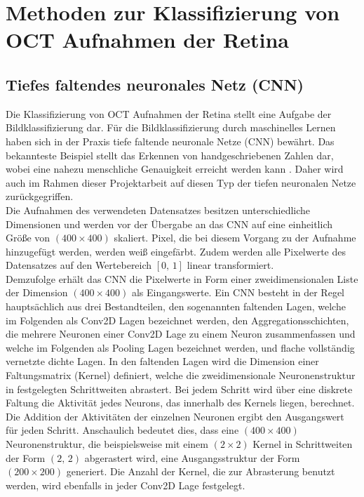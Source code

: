 \section{Methoden zur Klassifizierung von OCT Aufnahmen der Retina}
\subsection{Tiefes faltendes neuronales Netz (CNN)}
Die Klassifizierung von OCT Aufnahmen der Retina stellt eine Aufgabe der Bildklassifizierung dar. Für die Bildklassifizierung durch maschinelles Lernen haben sich in der Praxis tiefe faltende neuronale Netze (CNN) bewährt. Das bekannteste Beispiel stellt das Erkennen von handgeschriebenen Zahlen dar, wobei eine nahezu menschliche Genauigkeit erreicht werden kann \cite{MNIST}. Daher wird auch im Rahmen dieser Projektarbeit auf diesen Typ der tiefen neuronalen Netze zurückgegriffen. \\
Die Aufnahmen des verwendeten Datensatzes besitzen unterschiedliche Dimensionen und werden vor der Übergabe an das CNN auf eine einheitlich Grö{\ss}e von $(400\times 400)$ skaliert. Pixel, die bei diesem Vorgang zu der Aufnahme hinzugefügt werden, werden wei{\ss} eingefärbt. Zudem werden alle Pixelwerte des Datensatzes auf den Wertebereich $[0,\,1]$ linear transformiert. \\ 
Demzufolge erhält das CNN die Pixelwerte in Form einer zweidimensionalen Liste der Dimension $(400\times 400)$ als Eingangswerte. Ein CNN besteht in der Regel hauptsächlich aus drei Bestandteilen, den sogenannten faltenden Lagen, welche im Folgenden als Conv2D Lagen bezeichnet werden, den Aggregationsschichten, die mehrere Neuronen einer Conv2D Lage zu einem Neuron zusammenfassen und welche im Folgenden als Pooling Lagen bezeichnet werden, und flache vollständig vernetzte dichte Lagen. In den faltenden Lagen wird die Dimension einer Faltungsmatrix (Kernel) definiert, welche die zweidimensionale Neuronenstruktur in festgelegten Schrittweiten abrastert. Bei jedem Schritt wird über eine diskrete Faltung die Aktivität jedes Neurons, das innerhalb des Kernels liegen, berechnet. Die Addition der Aktivitäten der einzelnen Neuronen ergibt den Ausgangswert für jeden Schritt. Anschaulich bedeutet dies, dass eine $(400\times 400)$ Neuronenstruktur, die beispielsweise mit einem $(2 \times 2)$ Kernel in Schrittweiten der Form $(2,\,2)$ abgerastert wird, eine Ausgangsstruktur der Form $(200\times 200)$ generiert. Die Anzahl der Kernel, die zur Abrasterung benutzt werden, wird ebenfalls in jeder Conv2D Lage festgelegt.  \\
